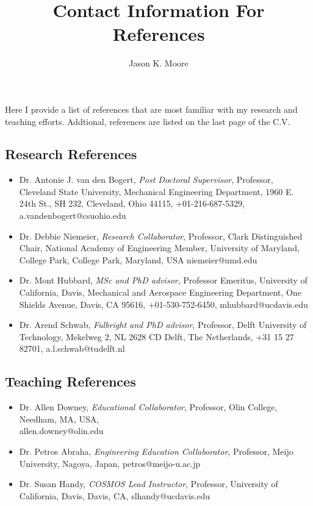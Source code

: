 \documentclass{article}
\title{Contact Information For References}
\author{Jason K. Moore}
\date{}
\begin{document}
\maketitle

Here I provide a list of references that are most familiar with my research and
teaching efforts. Addtional, references are listed on the last page of the C.V.

\subsection*{Research References}

\begin{itemize}
  \item Dr. Antonie J. van den Bogert,
    \emph{Post Doctoral Supervisor},
    Professor,
    Cleveland State University,
    Mechanical Engineering Department,
    1960 E. 24th St., SH 232,
    Cleveland, Ohio 44115,
    +01-216-687-5329,
    a.vandenbogert@csuohio.edu
  \item Dr. Debbie Niemeier,
    \emph{Research Collaborator},
    Professor,
    Clark Distinguished Chair,
    National Academy of Engineering Member,
    University of Maryland, College Park,
    College Park, Maryland, USA
    niemeier@umd.edu
  \item Dr. Mont Hubbard,
    \emph{MSc and PhD advisor},
    Professor Emeritus,
    University of California, Davis,
    Mechanical and Aerospace Engineering Department,
    One Shields Avenue, Davis, CA 95616,
    +01-530-752-6450,
    mhubbard@ucdavis.edu
  \item Dr. Arend Schwab,
    \emph{Fulbright and PhD advisor},
    Professor,
    Delft University of Technology,
    Mekelweg 2, NL 2628 CD Delft, The Netherlands,
    +31 15 27 82701,
    a.l.schwab@tudelft.nl
\end{itemize}

\subsection*{Teaching References}

\begin{itemize}
  \item Dr. Allen Downey,
    \emph{Educational Collaborator},
    Professor,
    Olin College,
    Needham, MA, USA,
    \\ allen.downey@olin.edu
  \item Dr. Petros Abraha,
    \emph{Engineering Education Collaborator},
    Professor,
    Meijo University,
    Nagoya, Japan,
    petros@meijo-u.ac.jp
  \item Dr. Susan Handy,
    \emph{COSMOS Lead Instructor},
    Professor,
    University of California, Davis,
    Davis, CA,
    slhandy@ucdavis.edu
\end{itemize}
\end{document}
